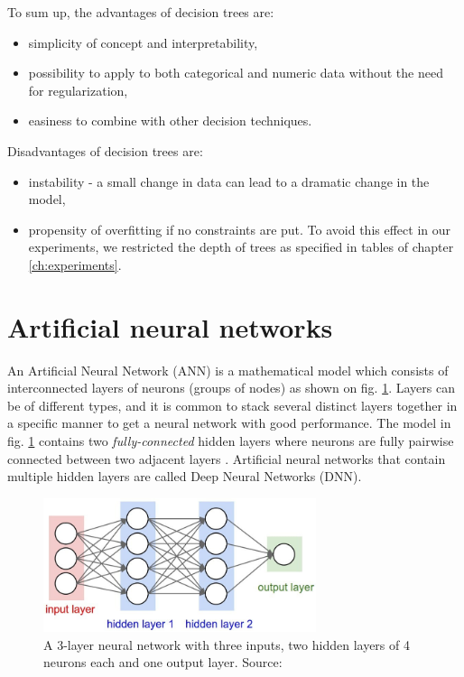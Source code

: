 To sum up, the advantages of decision trees are:
\begin{itemize}
    \item simplicity of concept and interpretability,
    \item possibility to apply to both categorical and numeric data without the need for regularization,
    \item easiness to combine with other decision techniques.
\end{itemize}

Disadvantages of decision trees are:
\begin{itemize}
    \item instability - a small change in data can lead to a dramatic change in the model,
    \item propensity of overfitting if no constraints are put. To avoid this effect in our experiments, we restricted the depth of trees as specified in tables of chapter \ref{ch:experiments}.
\end{itemize}


\section{Artificial neural networks}
An Artificial Neural Network (ANN) is a mathematical model which consists of interconnected layers of neurons (groups of nodes) as shown on fig. \ref{fig:neural-net}. Layers can be of different types, and it is common to stack several distinct layers together in a specific manner to get a neural network with good performance. The model in fig. \ref{fig:neural-net} contains two \textit{fully-connected} hidden layers where neurons are fully pairwise connected between two adjacent layers \citep{FeiFei-2016}. Artificial neural networks that contain multiple hidden layers are called Deep Neural Networks (DNN). 

\begin{figure}[h]
    \centering
    \includegraphics[width=8cm]{Images/Neural-network.jpg}
    \caption{A 3-layer neural network with three inputs, two hidden layers of 4 neurons each and one output layer. Source: \citep{FeiFei-2016}}
    \label{fig:neural-net}
\end{figure} 

